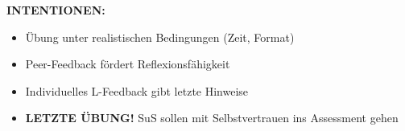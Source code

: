 \documentclass[11pt, a4paper]{article}
\begin{document}
\begin{dsbox}[title={DS 4 -- Letzte Bucharbeit vor Assessment (Di, 13.01.2026)}]
\vspace{0.2cm}

\textbf{INTENTIONEN:}
\begin{itemize}[leftmargin=1.5em, nosep]
    \item Übung unter realistischen Bedingungen (Zeit, Format)
    \item Peer-Feedback fördert Reflexionsfähigkeit
    \item Individuelles L-Feedback gibt letzte Hinweise
    \item \textbf{LETZTE ÜBUNG!} SuS sollen mit Selbstvertrauen ins Assessment gehen
\end{itemize}

\end{dsbox}

\newpage

\end{document}
